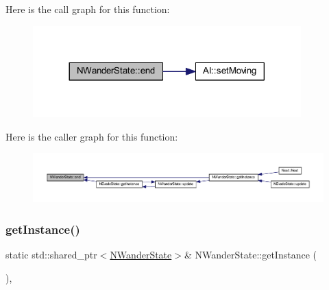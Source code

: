 Here is the call graph for this function\+:
\nopagebreak
\begin{figure}[H]
\begin{center}
\leavevmode
\includegraphics[width=293pt]{class_n_wander_state_acfff1d26985924da7d3c540a9399dd1d_cgraph}
\end{center}
\end{figure}
Here is the caller graph for this function\+:
\nopagebreak
\begin{figure}[H]
\begin{center}
\leavevmode
\includegraphics[width=350pt]{class_n_wander_state_acfff1d26985924da7d3c540a9399dd1d_icgraph}
\end{center}
\end{figure}
\mbox{\label{class_n_wander_state_a7e705fdb77af73c5dd8cfc8801f1a8ec}} 
\subsubsection{\texorpdfstring{get\+Instance()}{getInstance()}}
{\footnotesize\ttfamily static std\+::shared\+\_\+ptr$<$\hyperlink{class_n_wander_state}{N\+Wander\+State}$>$\& N\+Wander\+State\+::get\+Instance (\begin{DoxyParamCaption}{ }\end{DoxyParamCaption})\hspace{0.3cm}{\ttfamily [inline]}, {\ttfamily [static]}}

